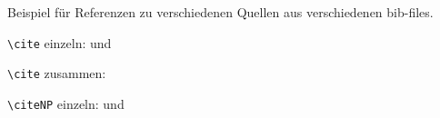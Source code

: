 \documentclass[a4paper,DIV13,BCOR0cm,draft=TRUE]{scrartcl}
\begin{document}
Beispiel für Referenzen zu verschiedenen Quellen aus verschiedenen bib-files.

\verb|\cite| einzeln: \cite{dummy2000} und \cite{DCRainmaker2018}

\verb|\cite| zusammen: \cite{dummy2000,DCRainmaker2018}

\verb|\citeNP| einzeln:  und 



\end{document}
